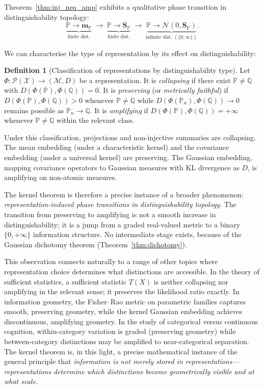 \documentclass[12pt, oneside]{book}
\theoremstyle{plain}
\theoremstyle{definition}
\newtheorem{definition}[theorem]{Definition}
\newcommand{\calX}{\mathcal{X}}
\newcommand{\calP}{\mathcal{P}}
\newcommand{\calN}{\mathcal{N}}
\newcommand{\PP}{\mathbb{P}}
\newcommand{\QQ}{\mathbb{Q}}
\newcommand{\mP}{\mathbf{m}_{\PP}}
\newcommand{\SP}{\mathbf{S}_{\PP}}
\newcommand{\calM}{\mathcal{M}}
\begin{document}
Theorem~\ref{thm:inj_neq_amp} exhibits a qualitative phase transition in distinguishability topology:
\begin{equation}
\underbrace{\PP \to \mP}_{\text{finite dist.}} \;\longrightarrow\; \underbrace{\PP \to \SP}_{\text{finite dist.}} \;\longrightarrow\; \underbrace{\PP \to \calN(0, \SP)}_{\text{infinite dist.} \;(\{0,\infty\})}.
\end{equation}

We can characterise the type of representation by its effect on distinguishability:

\begin{definition}[Classification of representations by distinguishability type]
\label{def:rep_types}
Let $\Phi: \calP(\calX) \to (\calM, D)$ be a representation. It is \emph{collapsing} if there exist $\PP \neq \QQ$ with $D(\Phi(\PP), \Phi(\QQ)) = 0$. It is \emph{preserving} (or \emph{metrically faithful}) if $D(\Phi(\PP), \Phi(\QQ)) > 0$ whenever $\PP \neq \QQ$ while $D(\Phi(\PP_n), \Phi(\QQ)) \to 0$ remains possible as $\PP_n \to \QQ$. It is \emph{amplifying} if $D(\Phi(\PP), \Phi(\QQ)) = +\infty$ whenever $\PP \neq \QQ$ within the relevant class.
\end{definition}

Under this classification, projections and non-injective summaries are collapsing. The mean embedding (under a characteristic kernel) and the covariance embedding (under a universal kernel) are preserving. The Gaussian embedding, mapping covariance operators to Gaussian measures with KL divergence as $D$, is amplifying on non-atomic measures.

The kernel theorem is therefore a precise instance of a broader phenomenon: \emph{representation-induced phase transitions in distinguishability topology}. The transition from preserving to amplifying is not a smooth increase in distinguishability; it is a jump from a graded real-valued metric to a binary $\{0, +\infty\}$ information structure. No intermediate stage exists, because of the Gaussian dichotomy theorem (Theorem~\ref{thm:dichotomy}).

This observation connects naturally to a range of other topics where representation choice determines what distinctions are accessible. In the theory of sufficient statistics, a sufficient statistic $T(X)$ is neither collapsing nor amplifying in the relevant sense; it preserves the likelihood ratio exactly. In information geometry, the Fisher--Rao metric on parametric families captures smooth, preserving geometry, while the kernel Gaussian embedding achieves discontinuous, amplifying geometry. In the study of categorical versus continuous cognition, within-category variation is graded (preserving geometry) while between-category distinctions may be amplified to near-categorical separation.
The kernel theorem is, in this light, a precise mathematical instance of the general principle that \emph{information is not merely stored in representations---representations determine which distinctions become geometrically visible and at what scale}.
\end{document}
